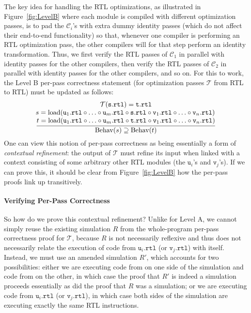 The key idea for handling the RTL optimizations, as illustrated in Figure~\ref{fig:LevelB} where
each module is compiled with different optimization passes, is to pad the $\mathcal{C}_i$'s with
extra dummy identity passes (which do not affect their end-to-end functionality) so that, whenever
one compiler is performing an RTL optimization pass, the other compilers will for that step perform
an identity transformation.  Thus, we first verify the RTL passes of $\mathcal{C}_1$ in parallel
with identity passes for the other compilers, then verify the RTL passes of $\mathcal{C}_2$ in
parallel with identity passes for the other compilers, and so on.  For this to work, the Level B
per-pass correctness statement (for optimization passes $\mathcal{T}$ from RTL to RTL) must be
updated as follows:
\[
\frac{
\begin{array}{@{}c@{}}
\mathcal{T}(\mathtt{s.rtl}) = \mathtt{t.rtl} \\
\!s = \mathrm{load}(\mathtt{u}_1\mathtt{.rtl}\circ \ldots \circ \mathtt{u}_m\mathtt{.rtl}\circ\mathtt{s.rtl} \circ \mathtt{v}_1\mathtt{.rtl}\circ \ldots \circ \mathtt{v}_n\mathtt{.rtl})\\
t = \mathrm{load}(\mathtt{u}_1\mathtt{.rtl}\circ \ldots \circ \mathtt{u}_m\mathtt{.rtl}\circ\mathtt{t.rtl}\circ \mathtt{v}_1\mathtt{.rtl}\circ \ldots \circ \mathtt{v}_n\mathtt{.rtl})
\end{array}
}
{
\mathrm{Behav}(s) 
\supseteq \mathrm{Behav}(t)
}
\]
One can view this notion of per-pass correctness as being essentially
a form of \emph{contextual refinement}: the output of $\mathcal{T}$
must refine its input when linked with a context consisting of some
arbitrary other RTL modules (the $\mathtt{u}_i$'s and
$\mathtt{v}_j$'s).  If we can prove this, it should be clear from
Figure~\ref{fig:LevelB} how the per-pass proofs link up transitively.

\paragraph{Verifying Per-Pass Correctness}

So how do we prove this contextual refinement?  Unlike for Level A, we
cannot simply reuse the existing simulation $R$ from the whole-program
per-pass correctness proof for $\mathcal{T}$, because $R$ is not
necessarily reflexive and thus does not necessarily relate the
execution of code from $\mathtt{u}_i\mathtt{.rtl}$ (or
$\mathtt{v}_j\mathtt{.rtl}$) with itself.  Instead, we must use an
amended simulation $R'$, which accounts for two possibilities: either
we are executing code from  on one side of the simulation and
code from  on the other, in which case the proof that $R'$ is
indeed a simulation proceeds essentially as did the proof that $R$
was a simulation; or we are executing code from
$\mathtt{u}_i\mathtt{.rtl}$ (or $\mathtt{v}_j\mathtt{.rtl}$), in which
case both sides of the simulation are executing exactly the same
RTL instructions.


